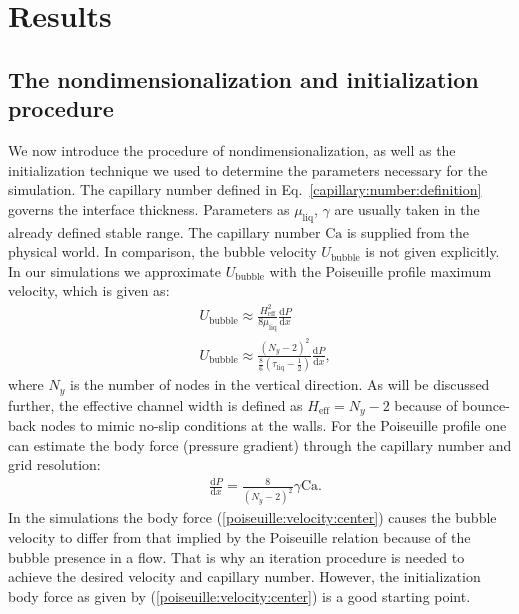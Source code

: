 \documentclass[preprint,12pt]{elsarticle}
\newcommand{\Ca}{\mathrm{Ca}}
\begin{document}
\section{Results}
\subsection{The nondimensionalization and initialization procedure}
\label{section:init}
We now introduce the procedure of nondimensionalization, as well as
the initialization technique we used to determine the parameters necessary for
the simulation. The capillary number defined in Eq.~\ref{capillary:number:definition} governs the
interface thickness.
{\color{red} Parameters as $\mu_{\mathrm{liq}}$, $\gamma$ are usually taken in the already defined
stable range. The capillary number $\Ca$ is supplied from the physical world.} 
In comparison, the bubble
velocity $U_{\mathrm{bubble}}$ is not given
explicitly.
In our simulations we approximate $U_{\mathrm{bubble}}$ with the
Poiseuille profile maximum velocity, which is given as:
\begin{equation}
\begin{aligned}
&U_{\mathrm{bubble}} \approx \frac{H_{\mathrm{eff}}^2}{8
\mu_{\mathrm{liq}}}\frac{\mathrm{d}P}{\mathrm{d}x}\\
&U_{\mathrm{bubble}}\approx
\frac{{(N_y-2)}^2}{\frac{8}{6}(\tau_{\mathrm{liq}}-\frac{1}{2})}\frac{\mathrm{d}P}{\mathrm{d}
x } ,
\end{aligned}
\end{equation}
where $N_y$ is the number of nodes in the vertical direction. As will be discussed further, the
effective channel width is defined as $H_{\mathrm{eff}}=N_y-2$ because of bounce-back nodes to
mimic no-slip conditions at the walls.
For the Poiseuille profile one can estimate the body force (pressure gradient) through the
capillary number and grid resolution:
\begin{equation}
\label{poiseuille:velocity:center}
\begin{aligned}
&\frac{\mathrm{d}P}{\mathrm{d}x}=\frac{8}{{(N_y-2)}^2}\gamma \Ca.
\end{aligned}
\end{equation}
In the simulations the body force (\ref{poiseuille:velocity:center}) causes the bubble
velocity to differ from that implied by the Poiseuille relation because of the bubble presence in a
flow. That is
why an iteration procedure is needed to achieve the 
desired velocity and 
capillary number. 
However, the initialization body force as given by (\ref{poiseuille:velocity:center}) is a good
starting point. 
\end{document}

